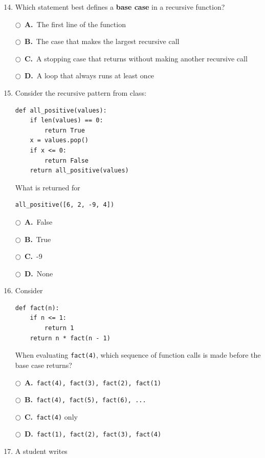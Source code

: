 \documentclass[11pt]{article}
\newcommand{\choice}[2]{%
    \par\noindent
    \(\bigcirc\)\ \textbf{#1.}\ #2
}
\begin{document}
\begin{enumerate}
\setcounter{enumi}{13}

\item Which statement best defines a \textbf{base case} in a recursive function?

\choice{A}{The first line of the function}
\choice{B}{The case that makes the largest recursive call}
\choice{C}{A stopping case that returns without making another recursive call}
\choice{D}{A loop that always runs at least once}

\item Consider the recursive pattern from class:

\begin{verbatim}
def all_positive(values):
    if len(values) == 0:
        return True
    x = values.pop()
    if x <= 0:
        return False
    return all_positive(values)
\end{verbatim}

What is returned for

\begin{verbatim}
all_positive([6, 2, -9, 4])
\end{verbatim}

\choice{A}{False}
\choice{B}{True}
\choice{C}{-9}
\choice{D}{None}

\item Consider

\begin{verbatim}
def fact(n):
    if n <= 1:
        return 1
    return n * fact(n - 1)
\end{verbatim}

When evaluating \texttt{fact(4)}, which sequence of function calls is made before the base case returns?

\choice{A}{\texttt{fact(4), fact(3), fact(2), fact(1)}}
\choice{B}{\texttt{fact(4), fact(5), fact(6), ...}}
\choice{C}{\texttt{fact(4)} only}
\choice{D}{\texttt{fact(1), fact(2), fact(3), fact(4)}}

\item A student writes


\end{enumerate}
\end{document}
